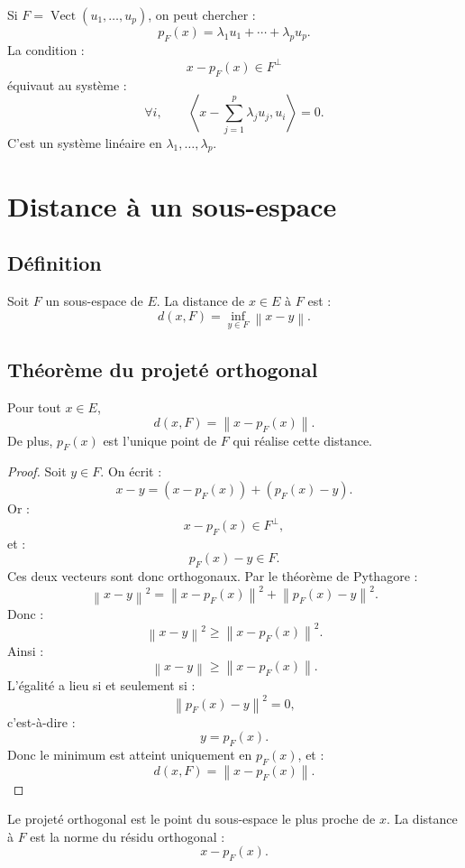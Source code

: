 \documentclass[11pt,a4paper]{article}
\newcommand{\Vect}{\operatorname{Vect}}
\newcommand{\norme}[1]{\left\lVert #1\right\rVert}
\newcommand{\scal}[2]{\left\langle #1,#2\right\rangle}
\begin{document}
\begin{methodbox}
Si \(F=\Vect(u_1,\dots,u_p)\), on peut chercher :
\[
p_F(x)=\lambda_1u_1+\cdots+\lambda_pu_p.
\]
La condition :
\[
x-p_F(x)\in F^\perp
\]
équivaut au système :
\[
\forall i,\qquad
\scal{x-\sum_{j=1}^p\lambda_ju_j}{u_i}=0.
\]
C'est un système linéaire en \(\lambda_1,\dots,\lambda_p\).
\end{methodbox}

\section{Distance à un sous-espace}

\subsection{Définition}

\begin{definitionbox}
Soit \(F\) un sous-espace de \(E\).  
La distance de \(x\in E\) à \(F\) est :
\[
d(x,F)=\inf_{y\in F}\norme{x-y}.
\]
\end{definitionbox}

\subsection{Théorème du projeté orthogonal}

\begin{theorembox}
Pour tout \(x\in E\),
\[
d(x,F)=\norme{x-p_F(x)}.
\]
De plus, \(p_F(x)\) est l'unique point de \(F\) qui réalise cette distance.
\end{theorembox}

\begin{proof}
Soit \(y\in F\).  
On écrit :
\[
x-y=(x-p_F(x))+(p_F(x)-y).
\]
Or :
\[
x-p_F(x)\in F^\perp,
\]
et :
\[
p_F(x)-y\in F.
\]
Ces deux vecteurs sont donc orthogonaux.  
Par le théorème de Pythagore :
\[
\norme{x-y}^2
=
\norme{x-p_F(x)}^2+\norme{p_F(x)-y}^2.
\]
Donc :
\[
\norme{x-y}^2\geq \norme{x-p_F(x)}^2.
\]
Ainsi :
\[
\norme{x-y}\geq \norme{x-p_F(x)}.
\]
L'égalité a lieu si et seulement si :
\[
\norme{p_F(x)-y}^2=0,
\]
c'est-à-dire :
\[
y=p_F(x).
\]
Donc le minimum est atteint uniquement en \(p_F(x)\), et :
\[
d(x,F)=\norme{x-p_F(x)}.
\]
\end{proof}

\begin{retenirbox}
Le projeté orthogonal est le point du sous-espace le plus proche de \(x\).  
La distance à \(F\) est la norme du résidu orthogonal :
\[
x-p_F(x).
\]
\end{retenirbox}
\end{document}
